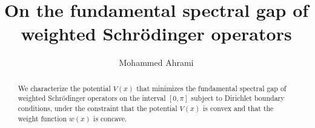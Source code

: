 \documentclass[12pt,a4paper]{amsart}
\begin{document}
 \title [Fundamental spectral gap] {On the fundamental spectral gap of weighted Schr\"{o}dinger operators }


\address{ \newline
Team of Modeling and Scientific Computing, 
Department of Mathematics, 
Multidisciplinary Faculty of Nador, 
University of Mohammed First, Morocco}









\author{Mohammed Ahrami}
 \maketitle


 \maketitle

\begin{abstract}
We characterize the potential $V(x)$ that minimizes the fundamental spectral gap of weighted Schr\"{o}dinger operators on the interval $[0,\pi]$ subject to Dirichlet boundary conditions, under the constraint that the potential $V(x)$ is convex and that the weight function $w(x)$ is concave.

\end{abstract}
\end{document}

